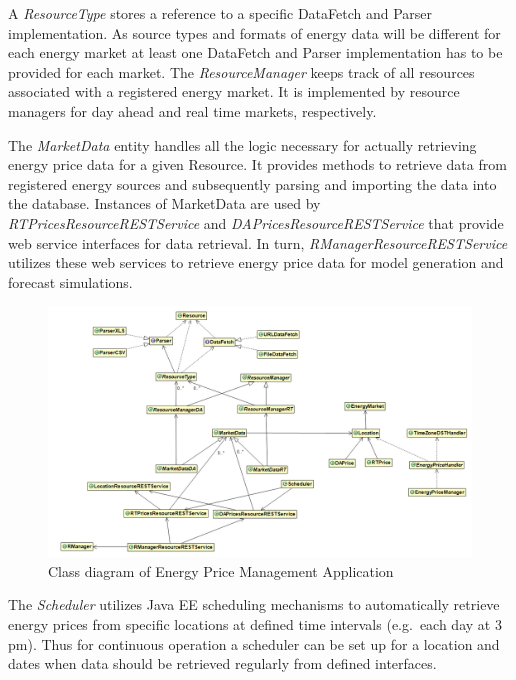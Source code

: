 A \textit{ResourceType} stores a reference to a specific DataFetch and Parser implementation. As source types and formats of energy data will be different for each energy market at least one DataFetch and Parser implementation has to be provided for each market. The \textit{ResourceManager} keeps track of all resources associated with a registered energy market. It is implemented by resource managers for day ahead and real time markets, respectively. 

The \textit{MarketData} entity handles all the logic necessary for actually retrieving energy price data for a given Resource. It provides methods to retrieve data from registered energy sources and subsequently parsing and importing the data into the database. Instances of MarketData are used by \textit{RTPricesResourceRESTService} and \textit{DAPricesResourceRESTService} that provide web service interfaces for data retrieval. In turn, \textit{RManagerResourceRESTService} utilizes these web services to retrieve energy price data for model generation and forecast simulations. 

\begin{figure}[htbp]
	\hspace*{0.5in}
		\includegraphics[angle=90,width=\paperheight,height=\paperwidth,keepaspectratio=true]{figures/forecasting/EPMA_class_diagram.png}
	\caption{Class diagram of Energy Price Management Application}
	\label{fig:EPMA_class_diagram}
\end{figure}

The \textit{Scheduler} utilizes Java EE scheduling mechanisms to automatically retrieve energy prices from specific locations at defined time intervals (e.g.~each day at 3 pm). Thus for continuous operation a scheduler can be set up for a location and dates when data should be retrieved regularly from defined interfaces. 

